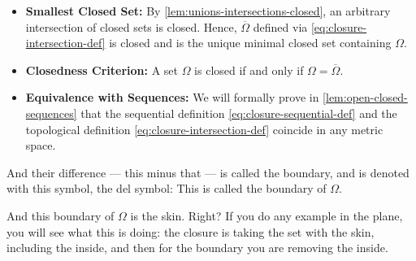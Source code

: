 \begin{content}

\begin{steps}
\begin{itemize}
    \item \textbf{Smallest Closed Set:} By \cref{lem:unions-intersections-closed}, an arbitrary intersection of closed sets is closed. Hence, $\overline{\Omega}$ defined via \eqref{eq:closure-intersection-def} is closed and is the unique minimal closed set containing $\Omega$.
    \item \textbf{Closedness Criterion:} A set $\Omega$ is closed if and only if $\Omega = \overline{\Omega}$.
    \item \textbf{Equivalence with Sequences:} We will formally prove in \cref{lem:open-closed-sequences} that the sequential definition \eqref{eq:closure-sequential-def} and the topological definition \eqref{eq:closure-intersection-def} coincide in any metric space.
\end{itemize}
\end{steps}
\end{content}

\begin{speech}[00:32:34 - 00:33:29]
And their difference --- this minus that --- is called the boundary, and is denoted with this symbol, the del symbol:  This is called the boundary of $\Omega$.

And this boundary of $\Omega$ is the skin.  Right? If you do any example in the plane, you will see what this is doing: the closure is taking the set with the skin, including the inside, and then for the boundary you are removing the inside.
\end{speech}

